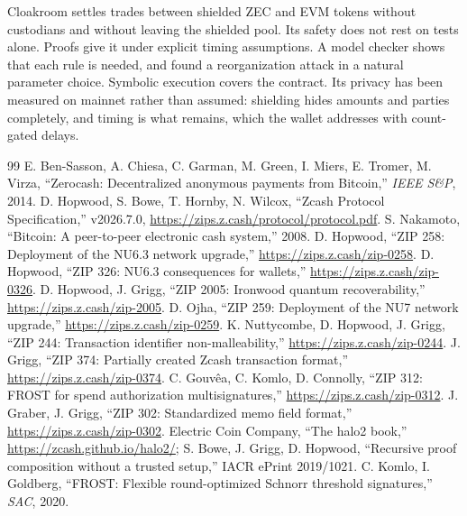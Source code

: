 \documentclass[10pt,letterpaper]{article}
\makeatletter
\renewcommand\section{\@startsection{section}{1}{\z@}{-1.3em}{0.45em}{\normalfont\large\bfseries}}
\theoremstyle{plain}
\theoremstyle{definition}
\makeatother
\begin{document}
\section{Conclusion}

Cloakroom settles trades between shielded ZEC and EVM tokens without custodians and without
leaving the shielded pool. Its safety does not rest on tests alone. Proofs give it under explicit
timing assumptions. A model checker shows that each rule is needed, and found a reorganization
attack in a natural parameter choice. Symbolic execution covers the contract. Its privacy has been
measured on mainnet rather than assumed: shielding hides amounts and parties completely, and
timing is what remains, which the wallet addresses with count-gated delays.

\renewcommand{\refname}{References}
\begin{thebibliography}{99}\small\setlength\itemsep{0.05em}
 E. Ben-Sasson, A. Chiesa, C. Garman, M. Green, I. Miers, E. Tromer, M. Virza, ``Zerocash: Decentralized anonymous payments from Bitcoin,'' \emph{IEEE S\&P}, 2014.
 D. Hopwood, S. Bowe, T. Hornby, N. Wilcox, ``Zcash Protocol Specification,'' v2026.7.0, \url{https://zips.z.cash/protocol/protocol.pdf}.
 S. Nakamoto, ``Bitcoin: A peer-to-peer electronic cash system,'' 2008.
 D. Hopwood, ``ZIP 258: Deployment of the NU6.3 network upgrade,'' \url{https://zips.z.cash/zip-0258}.
 D. Hopwood, ``ZIP 326: NU6.3 consequences for wallets,'' \url{https://zips.z.cash/zip-0326}.
 D. Hopwood, J. Grigg, ``ZIP 2005: Ironwood quantum recoverability,'' \url{https://zips.z.cash/zip-2005}.
 D. Ojha, ``ZIP 259: Deployment of the NU7 network upgrade,'' \url{https://zips.z.cash/zip-0259}.
 K. Nuttycombe, D. Hopwood, J. Grigg, ``ZIP 244: Transaction identifier non-malleability,'' \url{https://zips.z.cash/zip-0244}.
 J. Grigg, ``ZIP 374: Partially created Zcash transaction format,'' \url{https://zips.z.cash/zip-0374}.
 C. Gouv\^{e}a, C. Komlo, D. Connolly, ``ZIP 312: FROST for spend authorization multisignatures,'' \url{https://zips.z.cash/zip-0312}.
 J. Graber, J. Grigg, ``ZIP 302: Standardized memo field format,'' \url{https://zips.z.cash/zip-0302}.
 Electric Coin Company, ``The halo2 book,'' \url{https://zcash.github.io/halo2/}; S. Bowe, J. Grigg, D. Hopwood, ``Recursive proof composition without a trusted setup,'' IACR ePrint 2019/1021.
 C. Komlo, I. Goldberg, ``FROST: Flexible round-optimized Schnorr threshold signatures,'' \emph{SAC}, 2020.

\end{thebibliography}
\end{document}
